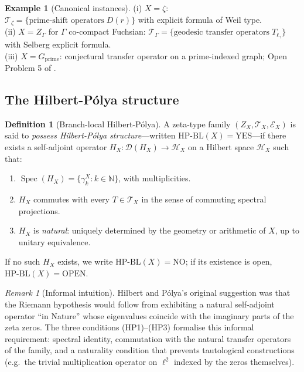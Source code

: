 \documentclass[11pt]{article}
\theoremstyle{definition}
\newtheorem{definition}[theorem]{Definition}
\newtheorem{example}[theorem]{Example}
\theoremstyle{remark}
\newtheorem{remark}[theorem]{Remark}
\newcommand{\HBL}{\mathrm{HP\text{-}BL}}
\newcommand{\Spec}{\operatorname{Spec}}
\begin{document}
\begin{example}[Canonical instances]\label{ex:canonical}
(i) $X = \zeta$: $\mathcal{T}_\zeta = \{\text{prime-shift operators}
\; D(r)\}$ with explicit formula of Weil type.\\
(ii) $X = Z_\Gamma$ for $\Gamma$ co-compact Fuchsian: $\mathcal{T}_\Gamma
= \{\text{geodesic transfer operators}\; T_{\ell_\gamma}\}$ with
Selberg explicit formula.\\
(iii) $X = G_\mathrm{prime}$: conjectural transfer operator on a
prime-indexed graph; Open Problem 5 of \cite{Geiger2026RHIII}.
\end{example}

\subsection{The Hilbert-P\'olya structure}

\begin{definition}[Branch-local Hilbert-P\'olya]\label{def:hp-bl}
A zeta-type family $(Z_X, \mathcal{T}_X, \mathcal{E}_X)$ is said to
\emph{possess Hilbert-P\'olya structure}---written $\HBL(X) =
\mathrm{YES}$---if there exists a self-adjoint operator
$H_X : \mathcal{D}(H_X) \to \mathcal{H}_X$ on a Hilbert space
$\mathcal{H}_X$ such that:
\begin{enumerate}
\item[(HP1)] $\Spec(H_X) = \{\gamma_k^X : k \in \mathbb{N}\}$, with
  multiplicities.
\item[(HP2)] $H_X$ commutes with every $T \in \mathcal{T}_X$ in the
  sense of commuting spectral projections.
\item[(HP3)] $H_X$ is \emph{natural}: uniquely determined by the
  geometry or arithmetic of $X$, up to unitary equivalence.
\end{enumerate}
If no such $H_X$ exists, we write $\HBL(X) = \mathrm{NO}$;
if its existence is open, $\HBL(X) = \mathrm{OPEN}$.
\end{definition}

\begin{remark}[Informal intuition]\label{rem:hp-informal}
Hilbert and P\'olya's original suggestion was that the Riemann
hypothesis would follow from exhibiting a natural self-adjoint
operator ``in Nature'' whose eigenvalues coincide with the imaginary
parts of the zeta zeros. The three conditions (HP1)--(HP3) formalise
this informal requirement: spectral identity, commutation with the
natural transfer operators of the family, and a naturality condition
that prevents tautological constructions (e.g.\ the trivial
multiplication operator on $\ell^2$ indexed by the zeros themselves).
\end{remark}
\end{document}
